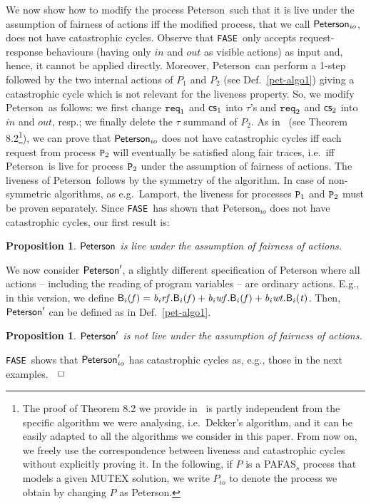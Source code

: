 \documentclass[copyright,creativecommons]{eptcs}
\def\altbox{\hspace{2mm}\nolinebreak\null\nolinebreak\hfill\Box}
\newenvironment{proof}{\noindent {\bf Proof:}}{$\altbox$\bigskip}
\newtheorem{proposition}[theorem]{Proposition}
\newcommand{\fase}{\texttt{FASE}}
\newcommand{\fa}{\mathit{f}}
\newcommand{\tr}{\mathit{t}}
\newcommand{\Bv}{{\sf B}}
\newcommand{\rfb}[1]{{\it b_{{\rm #1}}rf}}
\newcommand{\wtb}[1]{{\it b_{{\rm #1}}wt}}
\newcommand{\wfb}[1]{{\it b_{{\rm #1}}wf}}
\newcommand{\req}{{\tt req}}
\newcommand{\cs}{{\sf cs}}
\newcommand{\petersona}{{\sf Peterson}} \newcommand{\petersonb}{\petersona}
\newcommand{\proc}{{\tt P}}
\begin{document}
We now show how to modify the process \petersona\  such that it is live 
under the assumption of fairness of actions iff the modified process, that
we call $\petersona_{io}$, does not have catastrophic cycles. Observe that 
\fase\ only accepts request-response behaviours (having only $in$ and $out$
as visible actions) as input and, hence, it cannot be applied directly.
Moreover, \petersona\ can perform a 1-step followed by the two internal
actions of $P_1$ and $P_2$ (see Def.~\ref{pet-algo1}) giving a catastrophic
cycle which is not relevant for the liveness property. So, we modify
\petersona\ as follows: we first change $\req_1$ and $\cs_1$ into $\tau$'s
and $\req_2$ and $\cs_2$ into $in$ and $out$, resp.; we finally  delete the
$\tau$ summand of $P_2$. As in~\cite{CDV08tr} (see Theorem 8.2\footnote{The
proof of Theorem 8.2 we provide in~\cite{CDV08tr} is partly independent
from the specific algorithm we were analysing, i.e.\ Dekker's algorithm,
and it can be easily adapted to all the algorithms we consider in this
paper. From now on, we freely use the correspondence between liveness and
catastrophic cycles without explicitly proving it. In the following, if $P$
is a PAFAS$_s$ process that models a given MUTEX solution, we write
$P_{io}$ to denote the process we obtain by changing $P$ as \petersona.}),
we can prove that $\petersona_{io}$ does not have catastrophic cycles iff
each request from process $\proc_2$ will eventually be satisfied along fair
traces, i.e.\ iff \petersona\ is live for  process $\proc_2$ under the
assumption of fairness of actions. The liveness of \petersona\ follows by
the symmetry of the algorithm. In case of non-symmetric algorithms, as
e.g.\ Lamport, the liveness for processes $\proc_1$ and $\proc_2$  must be
proven separately. Since \fase\ has shown that \petersona$_{io}$ does not
have catastrophic cycles, our first result is:

\begin{proposition}\label{prop:pet-live}
$\petersona$ is live under the assumption of fairness of actions.
\end{proposition}
We now consider $\petersona'$, a slightly different specification of
Peterson where all actions -- including the reading of program variables --
are ordinary actions. E.g., in this version, we define $\Bv_i(\fa) =
\rfb{\it i}.\Bv_i(\fa) + \wfb{{\it i}}.\Bv_i(\fa) +
\wtb{{\it i}}. \Bv_i(\tr) $. Then,  $\petersona'$ can be defined as in
Def.~\ref{pet-algo1}.

\begin{proposition}\label{prop:pet-non-live} 
$\petersona'$  is not live under the assumption of fairness of actions.
\end{proposition}
\begin{proof}
\fase\  shows that $\petersona'_{io}$ has  catastrophic cycles as,
e.g., those in the next examples.
\end{proof}
\end{document}
